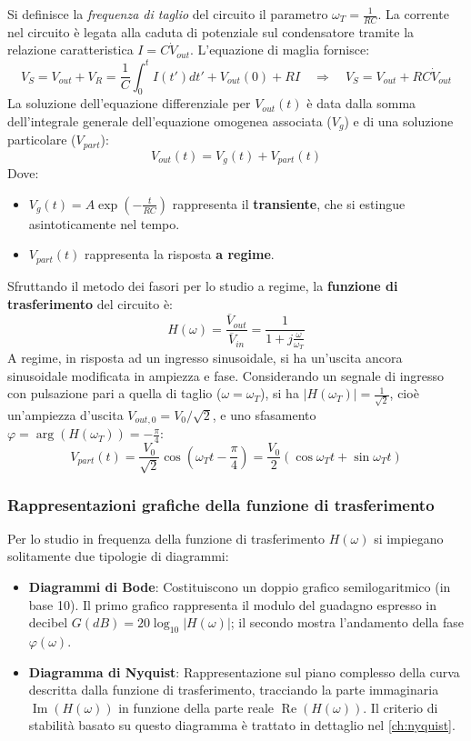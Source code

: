 Si definisce la \textit{frequenza di taglio} del circuito il parametro $\omega_T = \frac{1}{RC}$. La corrente nel circuito è legata alla caduta di potenziale sul condensatore tramite la relazione caratteristica $I = C \dot{V}_{out}$. L'equazione di maglia fornisce:
$$V_S = V_{out} + V_R = \frac{1}{C} \int_0^t I(t') dt' + V_{out}(0) + R I \quad \Rightarrow \quad V_S = V_{out} + R C \dot{V}_{out}$$
La soluzione dell'equazione differenziale per $V_{out}(t)$ è data dalla somma dell'integrale generale dell'equazione omogenea associata ($V_{g}$) e di una soluzione particolare ($V_{part}$):
$$ V_{out}(t) = V_{g}(t) + V_{part}(t) $$
Dove:
\begin{itemize}[label=$\rightarrow$]
    \item $V_{g}(t) = A \exp\left(-\frac{t}{RC}\right)$ rappresenta il \textbf{transiente}, che si estingue asintoticamente nel tempo.
    \item $V_{part}(t)$ rappresenta la risposta \textbf{a regime}.
\end{itemize}
Sfruttando il metodo dei fasori per lo studio a regime, la \textbf{funzione di trasferimento} del circuito è:
$$ H(\omega) = \frac{\overline{V}_{out}}{\overline{V}_{in}} = \frac{1}{1+j\frac{\omega}{\omega_T}} $$
A regime, in risposta ad un ingresso sinusoidale, si ha un'uscita ancora sinusoidale modificata in ampiezza e fase. Considerando un segnale di ingresso con pulsazione pari a quella di taglio ($\omega = \omega_T$), si ha $|H(\omega_T)| = \frac{1}{\sqrt{2}}$, cioè un'ampiezza d'uscita $V_{out,0} = V_0/\sqrt{2}$, e uno sfasamento $\varphi = \arg(H(\omega_T)) = -\frac{\pi}{4}$:
$$ V_{part}(t) = \frac{V_0}{\sqrt{2}} \cos\left(\omega_T t - \frac{\pi}{4}\right) = \frac{V_0}{2} \left( \cos \omega_T t + \sin \omega_T t \right) $$

\subsubsection*{Rappresentazioni grafiche della funzione di trasferimento}
Per lo studio in frequenza della funzione di trasferimento $H(\omega)$ si impiegano solitamente due tipologie di diagrammi:
\begin{itemize}[label=$\triangleright$]
    \item \textbf{Diagrammi di Bode}: Costituiscono un doppio grafico semilogaritmico (in base 10). Il primo grafico rappresenta il modulo del guadagno espresso in decibel $G(dB) = 20 \log_{10} |H(\omega)|$; il secondo mostra l'andamento della fase $\varphi(\omega)$.
    \item \textbf{Diagramma di Nyquist}: Rappresentazione sul piano complesso della curva descritta dalla funzione di trasferimento, tracciando la parte immaginaria $\operatorname{Im}(H(\omega))$ in funzione della parte reale $\operatorname{Re}(H(\omega))$. Il criterio di stabilità basato su questo diagramma è trattato in dettaglio nel \cref{ch:nyquist}.
\end{itemize}

